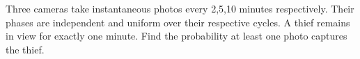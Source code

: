 Three cameras take instantaneous photos every 2,5,10 minutes respectively. Their phases are independent and uniform over their respective cycles. A thief remains in view for exactly one minute. Find the probability at least one photo captures the thief.
